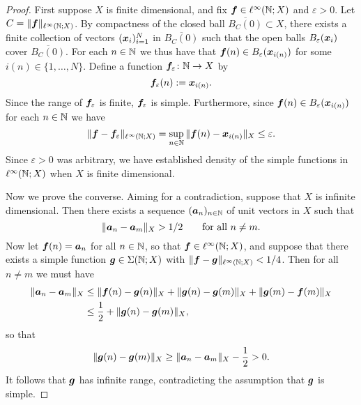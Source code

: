 \begin{proof}
  First suppose $X$ is finite dimensional, and fix $\bm{f} \in \ell^\infty(\mathbb{N};X)$ and $\varepsilon > 0$.
  Let $C = \|\bm{f}\|_{\ell^\infty(\mathbb{N};X)}$.
  By compactness of the closed ball $\overline{B_C(0)} \subset X$, there exists a finite collection of vectors $(\bm{x}_i)_{i=1}^N$ in $\overline{B_C(0)}$ such that the open balls $B_{\varepsilon}(\bm{x}_i)$ cover $\overline{B_C(0)}$.
  For each $n \in \mathbb{N}$ we thus have that $\bm{f}(n) \in B_{\varepsilon}(\bm{x}_{i(n)})$ for some $i(n) \in \{1,\ldots,N\}$.
  Define a function $\bm{f}_{\varepsilon} \colon \mathbb{N} \rightarrow X$ by
  \begin{equation*}
    \bm{f}_{\varepsilon}(n) := \bm{x}_{i(n)}.
  \end{equation*}
  Since the range of $\bm{f}_{\varepsilon}$ is finite, $\bm{f}_{\varepsilon}$ is simple.
  Furthermore, since $\bm{f}(n) \in B_{\varepsilon}(\bm{x}_{i(n)})$ for each $n \in \mathbb{N}$ we have
  \begin{equation*}
    \|\bm{f} - \bm{f}_{\varepsilon}\|_{\ell^\infty(\mathbb{N};X)} = \sup_{n \in \mathbb{N}} \|\bm{f}(n) - \bm{x}_{i(n)}\|_{X} \leq \varepsilon.
  \end{equation*}
  Since $\varepsilon > 0$ was arbitrary, we have established density of the simple functions in $\ell^\infty(\mathbb{N};X)$ when $X$ is finite dimensional.

  Now we prove the converse.
  Aiming for a contradiction, suppose that $X$ is infinite dimensional.
  Then there exists a sequence $(\bm{a}_n)_{n \in \mathbb{N}}$ of unit vectors in $X$ such that
  \begin{equation*}
    \|\bm{a}_n - \bm{a}_m\|_X > 1/2 \qquad \text{for all $n \neq m$.}
  \end{equation*}
  Now let $\bm{f}(n) = \bm{a}_n$ for all $n \in \mathbb{N}$, so that $\bm{f} \in \ell^\infty(\mathbb{N};X)$, and suppose that there exists a simple function $\bm{g} \in \Sigma(\mathbb{N};X)$ with $\|\bm{f} - \bm{g}\|_{\ell^\infty(\mathbb{N};X)} < 1/4$.
  Then for all $n \neq m$ we must have
  \begin{equation*}
    \begin{aligned}
      \|\bm{a}_n - \bm{a}_m\|_X &\leq \|\bm{f}(n) - \bm{g}(n)\|_X + \|\bm{g}(n) - \bm{g}(m)\|_X + \|\bm{g}(m) - \bm{f}(m)\|_X \\
      &\leq \frac{1}{2} + \|\bm{g}(n) - \bm{g}(m)\|_X,
    \end{aligned}
  \end{equation*}
  so that
  \begin{equation*}
    \|\bm{g}(n) - \bm{g}(m)\|_X \geq \|\bm{a}_n - \bm{a}_m\|_X - \frac{1}{2} > 0.
  \end{equation*}
  It follows that $\bm{g}$ has infinite range, contradicting the assumption that $\bm{g}$ is simple.
\end{proof}

